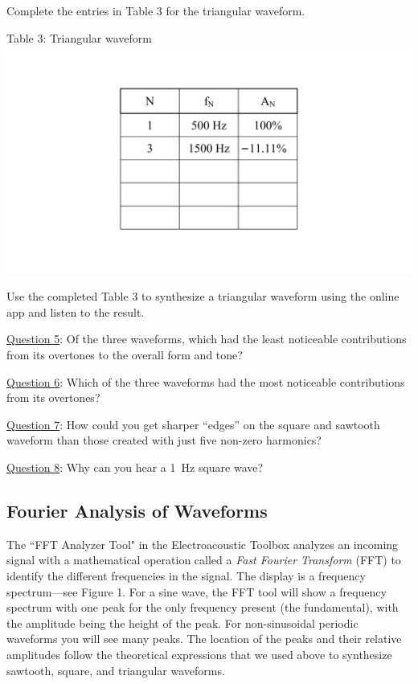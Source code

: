 \documentclass[11pt]{NSF}
\begin{document}
Complete the entries in Table 3 for the triangular waveform.
%
\begin{table}[hbtp]
\begin{center}
Table 3: Triangular waveform\\
\includegraphics[width=.35\textwidth]{tab5_3}
\label{t:3}
\end{center}
\end{table}
%

Use the completed Table 3 to synthesize a triangular 
waveform using the online app and listen to the result.

\underline{Question 5}: Of the three waveforms, which had the least noticeable 
contributions from its overtones to the overall form and tone?

\underline{Question 6}: Which of the three waveforms had the most 
noticeable contributions from its overtones?

\underline{Question 7}: How could you get sharper ``edges” on the square and 
sawtooth waveform than those created with just five non-zero
harmonics?

\underline{Question 8}: Why can you hear a 1~Hz square wave?


\subsection{Fourier Analysis of Waveforms}

The ``FFT Analyzer Tool" in the Electroacoustic Toolbox 
analyzes an incoming signal with a mathematical operation 
called a {\em Fast Fourier Transform} (FFT) to 
identify the different frequencies in the signal. 
The display is a frequency spectrum---see Figure 1.
For a sine wave, the FFT tool will show a frequency spectrum with one peak for
the only frequency present (the fundamental), 
with the amplitude being the height of the peak.
For non-sinusoidal periodic waveforms you will see many peaks.
The location of the peaks and their relative amplitudes 
follow the theoretical expressions that we used above to synthesize
sawtooth, square, and triangular waveforms.
\end{document}
